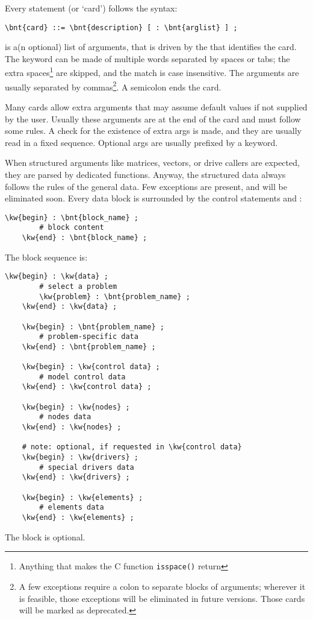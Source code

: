 Every statement (or `card') follows the syntax:
\begin{Verbatim}[commandchars=\\\{\}]
    \bnt{card} ::= \bnt{description} [ : \bnt{arglist} ] ;
\end{Verbatim}
 is a(n optional) list of arguments, that is driven by the 
 that identifies the card. 
The keyword can be made of multiple words separated by spaces or tabs; 
the extra spaces\footnote{
	Anything that makes the C function \texttt{isspace()} 
	return 
} are skipped, and the match is case insensitive. 
The arguments are usually separated by commas\footnote{
	A few exceptions require a colon to separate blocks of arguments;
	wherever it is feasible, those exceptions will be eliminated 
	in future versions.
	Those cards will be marked as deprecated.
}.
A semicolon ends the card. 

Many cards allow extra arguments that may assume default values 
if not supplied by the user. 
Usually these arguments are at the end of the card
and must follow some rules. 
A check for the existence of extra args is made,
and they are usually read in a fixed sequence.
Optional args are usually prefixed by a keyword.

When structured arguments like matrices, vectors, or drive callers are
expected, they are parsed by dedicated functions.
Anyway, the structured data always follows the rules of the general data. 
Few exceptions are present, and will be eliminated soon.
Every data block is surrounded by the control statements  and
:
\begin{Verbatim}[commandchars=\\\{\}]
    \kw{begin} : \bnt{block_name} ;
        # block content
    \kw{end} : \bnt{block_name} ;
\end{Verbatim}
The block sequence is:
\begin{Verbatim}[commandchars=\\\{\}]
    \kw{begin} : \kw{data} ;
        # select a problem
        \kw{problem} : \bnt{problem_name} ;
    \kw{end} : \kw{data} ;

    \kw{begin} : \bnt{problem_name} ;
        # problem-specific data
    \kw{end} : \bnt{problem_name} ;

    \kw{begin} : \kw{control data} ;
        # model control data
    \kw{end} : \kw{control data} ;

    \kw{begin} : \kw{nodes} ;
        # nodes data
    \kw{end} : \kw{nodes} ;

    # note: optional, if requested in \kw{control data}
    \kw{begin} : \kw{drivers} ;
        # special drivers data
    \kw{end} : \kw{drivers} ;

    \kw{begin} : \kw{elements} ;
        # elements data
    \kw{end} : \kw{elements} ;
\end{Verbatim}
The  block is optional.


